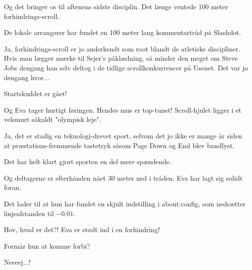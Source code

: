 \documentclass[a4paper,11pt]{article}
\begin{document}
\begin{sketch}

   Og det bringer os til aftenens sidste disciplin. Det længe ventede
  100 meter forhindrings-scroll.


   De lokale arrangører har fundet en 100 meter lang kommentartråd på
  Slashdot.

   Ja, forhindrings-scroll er jo anderkendt som root blandt
  de atletiske discipliner.  Hvis man lægger mærke til Sejer's
  påklædning, så minder den meget om Steve Jobs dengang han selv
  deltog i de tidlige scrollkonkurrencer på Usenet.  Det var jo
  dengang hvor...


   Startskuddet er gået!

   Og Eva tager hurtigt føringen. Hendes mus er top-tunet!
  Scroll-hjulet ligger i et velsmurt såkaldt "olympisk leje".

   Ja, det er stadig en teknologi-drevet sport, selvom det jo
  ikke er mange år siden at præstations-fremmende tastetryk såsom Page
  Down og End blev bandlyst.

   Det har helt klart gjort sporten en del mere spændende.

   Og deltagerne er efterhånden nået 30 meter ned i tråden. Eva har
  lagt sig solidt foran.

   Det lader til at hun har fundet en skjult indstilling i
  about:config, som nedsætter linjeafstanden til $-0.01$.


   Hov, hvad er det?! Eva er stødt ind i en forhindring!


   Formår hun at komme forbi?


   Neeeej...!


\end{sketch}
\end{document}
